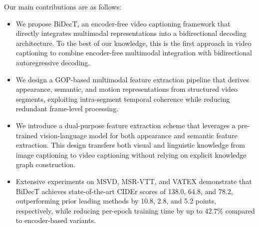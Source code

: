 Our main contributions are as follows:
\begin{itemize}
\item We propose BiDecT, an encoder-free video captioning framework that directly integrates multimodal representations into a bidirectional decoding architecture. To the best of our knowledge, this is the first approach in video captioning to combine encoder-free multimodal integration with bidirectional autoregressive decoding.
\item We design a GOP-based multimodal feature extraction pipeline that derives appearance, semantic, and motion representations from structured video segments, exploiting intra-segment temporal coherence while reducing redundant frame-level processing.
\item We introduce a dual-purpose feature extraction scheme that leverages a pre-trained vision-language model for both appearance and semantic feature extraction. This design transfers both visual and linguistic knowledge from image captioning to video captioning without relying on explicit knowledge graph construction.
\item Extensive experiments on MSVD, MSR-VTT, and VATEX demonstrate that BiDecT achieves state-of-the-art CIDEr scores of 138.0, 64.8, and 78.2, outperforming prior leading methods by 10.8, 2.8, and 5.2 points, respectively, while reducing per-epoch training time by up to 42.7\% compared to encoder-based variants.
\end{itemize}

